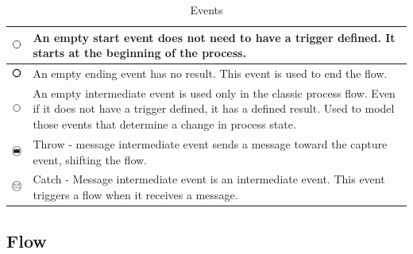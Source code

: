 \documentclass[thesis=M,english]{FITthesis}[2019/12/23]
\begin{document}
\begin{table}[ht!]
\caption{Events} \label{tableEvent}
\begin{center}
\begin{tabular}{ | p{1cm} | m{9cm} | } \hline
    \includegraphics[width=1cm]{assets/BPNMicons/PraznaStartovaciaUdalost.pdf} & An empty start event does not need to have a trigger defined. It starts at the beginning of the process. \\   \hline
    \includegraphics[width=1cm]{assets/BPNMicons/PrazdnaKoncovaUdalost.pdf} & An empty ending event has no result. This event is used to end the flow.  \\  \hline
    \includegraphics[width=1cm]{assets/BPNMicons/PrazdnaMedzilahlaUdalost.pdf} & 
An empty intermediate event is used only in the classic process flow. Even if it does not have a trigger defined, it has a defined result. Used to model those events that determine a change in process state.  \\ \hline
    \includegraphics[width=1cm]{assets/BPNMicons/messageThrow.pdf} & Throw - message intermediate event sends a message toward the capture event, shifting the flow.\\ \hline
    \includegraphics[width=1cm]{assets/BPNMicons/messageCatch.pdf} & Catch - Message intermediate event is an intermediate event. This event triggers a flow when it receives a message.  \\ \hline
\end{tabular}
\end{center}
\end{table}


\subsection{Flow}
\end{document}
